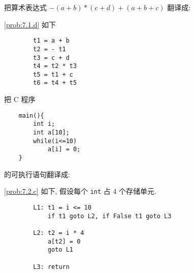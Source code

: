 \documentclass[boxes]{homework}
\begin{document}
\begin{problem}
把算术表达式 $-(a + b) * (c + d) + (a + b + c)$ 翻译成:
\end{problem}
\begin{solution}
    \ref{prob:7.1.d} 如下
    \begin{verbatim}
        t1 = a + b
        t2 = - t1
        t3 = c + d
        t4 = t2 * t3
        t5 = t1 + c
        t6 = t4 + t5   
    \end{verbatim}
\end{solution}

\begin{problem}
把 C 程序
\begin{verbatim}
    main(){
        int i;
        int a[10];
        while(i<=10)
            a[i] = 0;
    }
\end{verbatim}
的可执行语句翻译成:
\end{problem}
\begin{solution}
    \ref{prob:7.2.c} 如下, 假设每个 \texttt{int} 占 4 个存储单元.
    \begin{verbatim}
        L1: t1 = i <= 10
            if t1 goto L2, if False t1 goto L3

        L2: t2 = i * 4
            a[t2] = 0
            goto L1

        L3: return
    \end{verbatim}
\end{solution}
\end{document}
